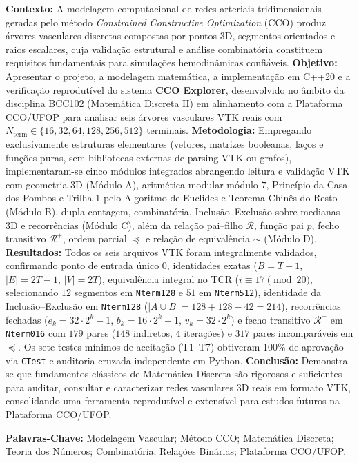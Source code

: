 \documentclass[11pt, a4paper]{article}
\begin{document}
\begin{tcolorbox}[colback=lightgray, colframe=deepnavy, arc=3pt, title=\textbf{RESUMO}, fonttitle=\bfseries]
\small
\textbf{Contexto:} A modelagem computacional de redes arteriais tridimensionais geradas pelo método \emph{Constrained Constructive Optimization} (CCO) produz árvores vasculares discretas compostas por pontos 3D, segmentos orientados e raios escalares, cuja validação estrutural e análise combinatória constituem requisitos fundamentais para simulações hemodinâmicas confiáveis.
\textbf{Objetivo:} Apresentar o projeto, a modelagem matemática, a implementação em C++20 e a verificação reprodutível do sistema \textbf{CCO Explorer}, desenvolvido no âmbito da disciplina BCC102 (Matemática Discreta II) em alinhamento com a Plataforma CCO/UFOP para analisar seis árvores vasculares VTK reais com $N_{\mathrm{term}} \in \{16, 32, 64, 128, 256, 512\}$ terminais.
\textbf{Metodologia:} Empregando exclusivamente estruturas elementares (vetores, matrizes booleanas, laços e funções puras, sem bibliotecas externas de parsing VTK ou grafos), implementaram-se cinco módulos integrados abrangendo leitura e validação VTK com geometria 3D (Módulo A), aritmética modular módulo $7$, Princípio da Casa dos Pombos e Trilha 1 pelo Algoritmo de Euclides e Teorema Chinês do Resto (Módulo B), dupla contagem, combinatória, Inclusão--Exclusão sobre medianas 3D e recorrências (Módulo C), além da relação pai--filho $\mathcal{R}$, função pai $p$, fecho transitivo $\mathcal{R}^+$, ordem parcial $\preceq$ e relação de equivalência $\sim$ (Módulo D).
\textbf{Resultados:} Todos os seis arquivos VTK foram integralmente validados, confirmando ponto de entrada único $0$, identidades exatas ($B = T - 1$, $|E| = 2T - 1$, $|V| = 2T$), equivalência integral no TCR ($i \equiv 17 \pmod{20}$, selecionando $12$ segmentos em \texttt{Nterm128} e $51$ em \texttt{Nterm512}), identidade da Inclusão--Exclusão em \texttt{Nterm128} ($|A \cup B| = 128 + 128 - 42 = 214$), recorrências fechadas ($e_k = 32\cdot 2^k - 1$, $b_k = 16\cdot 2^k - 1$, $v_k = 32\cdot 2^k$) e fecho transitivo $\mathcal{R}^+$ em \texttt{Nterm016} com $179$ pares ($148$ indiretos, $4$ iterações) e $317$ pares incomparáveis em $\preceq$. Os sete testes mínimos de aceitação (T1--T7) obtiveram 100\% de aprovação via \texttt{CTest} e auditoria cruzada independente em Python.
\textbf{Conclusão:} Demonstra-se que fundamentos clássicos de Matemática Discreta são rigorosos e suficientes para auditar, consultar e caracterizar redes vasculares 3D reais em formato VTK, consolidando uma ferramenta reprodutível e extensível para estudos futuros na Plataforma CCO/UFOP.

\vspace{0.2cm}
\textbf{Palavras-Chave:} Modelagem Vascular; Método CCO; Matemática Discreta; Teoria dos Números; Combinatória; Relações Binárias; Plataforma CCO/UFOP.
\end{tcolorbox}
\end{document}
